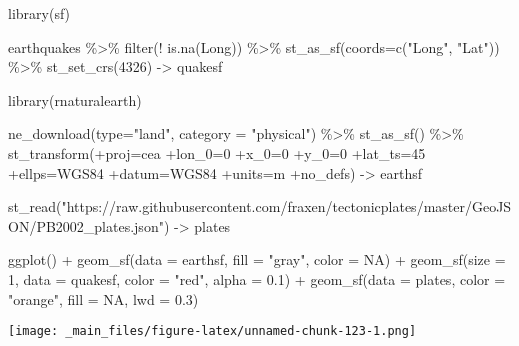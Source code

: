 \documentclass[
  ngerman,
]{article}
\newenvironment{Shaded}{\begin{snugshade}}{\end{snugshade}}
\newcommand{\AttributeTok}[1]{\textcolor[rgb]{0.77,0.63,0.00}{#1}}
\newcommand{\ConstantTok}[1]{\textcolor[rgb]{0.00,0.00,0.00}{#1}}
\newcommand{\DecValTok}[1]{\textcolor[rgb]{0.00,0.00,0.81}{#1}}
\newcommand{\FloatTok}[1]{\textcolor[rgb]{0.00,0.00,0.81}{#1}}
\newcommand{\FunctionTok}[1]{\textcolor[rgb]{0.00,0.00,0.00}{#1}}
\newcommand{\NormalTok}[1]{#1}
\newcommand{\OtherTok}[1]{\textcolor[rgb]{0.56,0.35,0.01}{#1}}
\newcommand{\SpecialCharTok}[1]{\textcolor[rgb]{0.00,0.00,0.00}{#1}}
\newcommand{\StringTok}[1]{\textcolor[rgb]{0.31,0.60,0.02}{#1}}
\begin{document}
\begin{Shaded}
\begin{Highlighting}[]
\FunctionTok{library}\NormalTok{(sf)}

\NormalTok{earthquakes }\SpecialCharTok{\%\textgreater{}\%}
  \FunctionTok{filter}\NormalTok{(}\SpecialCharTok{!} \FunctionTok{is.na}\NormalTok{(Long)) }\SpecialCharTok{\%\textgreater{}\%}
  \FunctionTok{st\_as\_sf}\NormalTok{(}\AttributeTok{coords=}\FunctionTok{c}\NormalTok{(}\StringTok{"Long"}\NormalTok{, }\StringTok{"Lat"}\NormalTok{)) }\SpecialCharTok{\%\textgreater{}\%}
  \FunctionTok{st\_set\_crs}\NormalTok{(}\DecValTok{4326}\NormalTok{) }\OtherTok{{-}\textgreater{}}\NormalTok{ quakesf}

\FunctionTok{library}\NormalTok{(rnaturalearth)}

\FunctionTok{ne\_download}\NormalTok{(}\AttributeTok{type=}\StringTok{"land"}\NormalTok{, }\AttributeTok{category =} \StringTok{"physical"}\NormalTok{) }\SpecialCharTok{\%\textgreater{}\%}
  \FunctionTok{st\_as\_sf}\NormalTok{() }\SpecialCharTok{\%\textgreater{}\%}
  \FunctionTok{st\_transform}\NormalTok{(}\StringTok{\textquotesingle{}+proj=cea +lon\_0=0 +x\_0=0 +y\_0=0 +lat\_ts=45 +ellps=WGS84 +datum=WGS84 +units=m +no\_defs\textquotesingle{}}\NormalTok{) }\OtherTok{{-}\textgreater{}}\NormalTok{ earthsf}

\FunctionTok{st\_read}\NormalTok{(}\StringTok{"https://raw.githubusercontent.com/fraxen/tectonicplates/master/GeoJSON/PB2002\_plates.json"}\NormalTok{) }\OtherTok{{-}\textgreater{}}\NormalTok{ plates}

\FunctionTok{ggplot}\NormalTok{() }\SpecialCharTok{+}
  \FunctionTok{geom\_sf}\NormalTok{(}\AttributeTok{data =}\NormalTok{ earthsf, }\AttributeTok{fill =} \StringTok{"gray"}\NormalTok{, }\AttributeTok{color =} \ConstantTok{NA}\NormalTok{) }\SpecialCharTok{+}
  \FunctionTok{geom\_sf}\NormalTok{(}\AttributeTok{size =} \DecValTok{1}\NormalTok{, }\AttributeTok{data =}\NormalTok{ quakesf, }\AttributeTok{color =} \StringTok{"red"}\NormalTok{, }\AttributeTok{alpha =} \FloatTok{0.1}\NormalTok{) }\SpecialCharTok{+}
  \FunctionTok{geom\_sf}\NormalTok{(}\AttributeTok{data =}\NormalTok{ plates, }\AttributeTok{color =} \StringTok{"orange"}\NormalTok{, }\AttributeTok{fill =} \ConstantTok{NA}\NormalTok{, }\AttributeTok{lwd =} \FloatTok{0.3}\NormalTok{)}
\end{Highlighting}
\end{Shaded}

\texttt{[image: \_main\_files/figure-latex/unnamed-chunk-123-1.png]}
\end{document}
